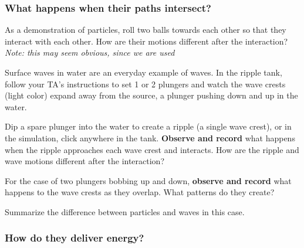 \subsubsection{What happens when their paths intersect?}


\begin{steps}
	\item As a demonstration of particles, roll two balls towards each other so that they interact with each other. How are their motions different after the interaction? \textit{Note: this may seem obvious, since we are used}
	
	\item Surface waves in water are an everyday example of waves. In the ripple tank, follow your TA's instructions to set 1 or 2 plungers and watch the wave crests (light color) expand away from the source, a plunger pushing down and up in the water.
	
	\item Dip a spare plunger into the water to create a ripple (a single wave crest), or in the simulation, click anywhere in the tank. \textbf{Observe and record} what happens when the ripple approaches each wave crest and interacts. How are the ripple and wave motions different after the interaction?
	
	\item For the case of two plungers bobbing up and down, \textbf{observe and record} what happens to the wave crests as they overlap. What patterns do they create?

	\item Summarize the difference between particles and waves in this case.

\end{steps}

\subsubsection{How do they deliver energy?}

